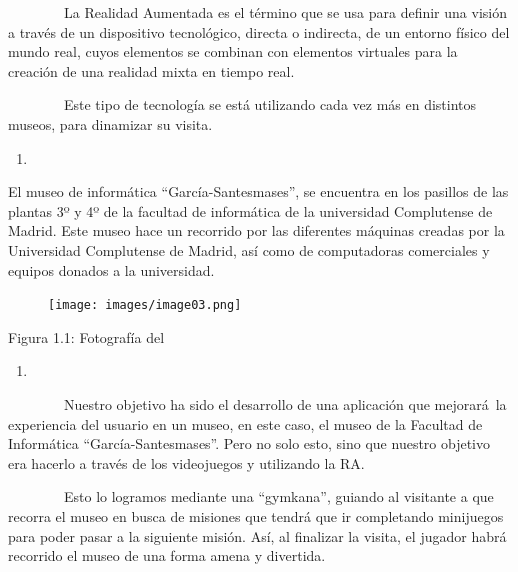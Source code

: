 ~~~~~~~~La Realidad Aumentada es el término que se usa para definir una
visión a través de un dispositivo tecnológico, directa o indirecta, de
un entorno físico del mundo real, cuyos elementos se combinan con
elementos virtuales para la creación de una realidad mixta en tiempo
real. ~~~~~~~~~~~~~~~~~

~~~~~~~~Este tipo de tecnología se está utilizando cada vez más en
distintos museos, para dinamizar su visita.

\begin{enumerate}
\def\labelenumi{\arabic{enumi}.}
\setcounter{enumi}{1}
\item
\end{enumerate}

El museo de informática ``García-Santesmases'', se encuentra en los
pasillos de las plantas 3º y 4º de la facultad de informática de la
universidad Complutense de Madrid. Este museo hace un recorrido por las
diferentes máquinas creadas por la Universidad Complutense de Madrid,
así como de computadoras comerciales y equipos donados a la universidad.

\begin{figure}[htbp]
\centering
\texttt{[image: images/image03.png]}
\end{figure}

Figura 1.1: Fotografía del

\begin{enumerate}
\def\labelenumi{\arabic{enumi}.}
\setcounter{enumi}{2}
\item
\end{enumerate}

~~~~~~~~Nuestro objetivo ha sido el desarrollo de una aplicación que
mejorará~la experiencia del usuario en un museo, en este caso, el museo
de la Facultad de Informática ``García-Santesmases''. Pero no solo esto,
sino que nuestro objetivo era hacerlo a través de los videojuegos y
utilizando la RA.

~~~~~~~~Esto lo logramos mediante una ``gymkana'', guiando al visitante
a que recorra el museo en busca de misiones que tendrá que ir
completando minijuegos para poder pasar a la siguiente misión. Así, al
finalizar la visita, el jugador habrá recorrido el museo de una forma
amena y divertida.

